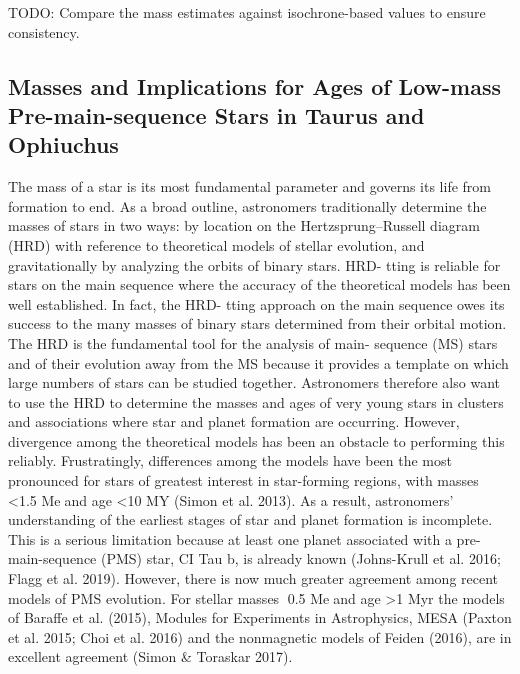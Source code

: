 \documentclass[../main.tex]{subfiles}
\begin{document}
{TODO: Compare the mass estimates against isochrone-based values to ensure consistency.

\subsection{Masses and Implications for Ages of Low-mass Pre-main-sequence Stars in Taurus and
	Ophiuchus}

The mass of a star is its most fundamental parameter and
governs its life from formation to end. As a broad outline,
astronomers traditionally determine the masses of stars in two
ways: by location on the Hertzsprung–Russell diagram (HRD)
with reference to theoretical models of stellar evolution, and
gravitationally by analyzing the orbits of binary stars. HRD-
tting is reliable for stars on the main sequence where the
accuracy of the theoretical models has been well established. In
fact, the HRD- tting approach on the main sequence owes its
success to the many masses of binary stars determined from
their orbital motion.
The HRD is the fundamental tool for the analysis of main-
sequence (MS) stars and of their evolution away from the MS
because it provides a template on which large numbers of stars
can be studied together. Astronomers therefore also want to use
the HRD to determine the masses and ages of very young stars
in clusters and associations where star and planet formation are
occurring. However, divergence among the theoretical models
has been an obstacle to performing this reliably. Frustratingly,
differences among the models have been the most pronounced
for stars of greatest interest in star-forming regions, with
masses <1.5 Meand age <10 MY (Simon et al. 2013). As a
result, astronomers’ understanding of the earliest stages of star
and planet formation is incomplete. This is a serious limitation
because at least one planet associated with a pre-main-sequence
(PMS) star, CI Tau b, is already known (Johns-Krull et al. 2016;
Flagg et al. 2019). However, there is now much greater agreement
among recent models of PMS evolution. For stellar masses
0.5 Meand age >1 Myr the models of Baraffe et al. (2015),
Modules for Experiments in Astrophysics, MESA (Paxton et al.
2015; Choi et al. 2016) and the nonmagnetic models of Feiden
(2016), are in excellent agreement (Simon & Toraskar 2017).

}
\end{document}
